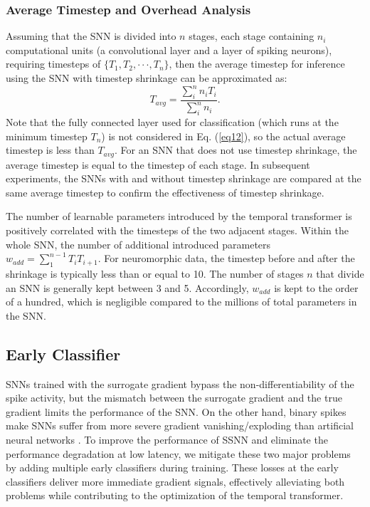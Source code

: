 \documentclass[letterpaper]{article} %
\begin{document}
\subsubsection{Average Timestep and Overhead Analysis}
Assuming that the SNN is divided into $n$ stages, each stage containing $n_i$ computational units (a convolutional layer and a layer of spiking neurons), requiring timesteps of $\{T_1,T_2,\cdot\cdot\cdot,T_n\}$, then the average timestep for inference using the SNN with timestep shrinkage can be approximated as:
\begin{equation}
T_{avg}=\frac {\sum_i^n {n_iT_i}} {\sum_i^n n_i}.
\label{eq12}
\end{equation}
Note that the fully connected layer used for classification (which runs at the minimum timestep $T_n$) is not considered in Eq. (\ref{eq12}), so the actual average timestep is less than $T_{avg}$. For an SNN that does not use timestep shrinkage, the average timestep is equal to the timestep of each stage. In subsequent experiments, the SNNs with and without timestep shrinkage are compared at the same average timestep to confirm the effectiveness of timestep shrinkage.

The number of learnable parameters introduced by the temporal transformer is positively correlated with the timesteps of the two adjacent stages. Within the whole SNN, the number of additional introduced parameters $w_{add}=\sum_1^{n-1} {T_iT_{i+1}}$. For neuromorphic data, the timestep before and after the shrinkage is typically less than or equal to 10. The number of stages $n$ that divide an SNN is generally kept between 3 and 5. Accordingly, $w_{add}$ is kept to the order of a hundred, which is negligible compared to the millions of total parameters in the SNN.

\subsection{Early Classifier}

SNNs trained with the surrogate gradient bypass the non-differentiability of the spike activity, but the mismatch between the surrogate gradient and the true gradient limits the performance of the SNN. On the other hand, binary spikes make SNNs suffer from more severe gradient vanishing/exploding than artificial neural networks \cite{SEWResNet}. To improve the performance of SSNN and eliminate the performance degradation at low latency, we mitigate these two major problems by adding multiple early classifiers during training. These losses at the early classifiers deliver more immediate gradient signals, effectively alleviating both problems while contributing to the optimization of the temporal transformer.
\end{document}
